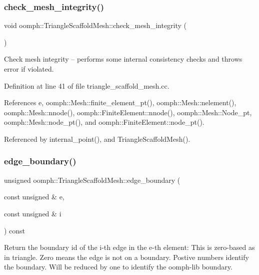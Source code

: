 \subsubsection{\texorpdfstring{check\+\_\+mesh\+\_\+integrity()}{check\_mesh\_integrity()}}
{\footnotesize\ttfamily void oomph\+::\+Triangle\+Scaffold\+Mesh\+::check\+\_\+mesh\+\_\+integrity (\begin{DoxyParamCaption}{ }\end{DoxyParamCaption})\hspace{0.3cm}{\ttfamily [protected]}}

Check mesh integrity -- performs some internal consistency checks and throws error if violated. 

Definition at line 41 of file triangle\+\_\+scaffold\+\_\+mesh.\+cc.



References e, oomph\+::\+Mesh\+::finite\+\_\+element\+\_\+pt(), oomph\+::\+Mesh\+::nelement(), oomph\+::\+Mesh\+::nnode(), oomph\+::\+Finite\+Element\+::nnode(), oomph\+::\+Mesh\+::\+Node\+\_\+pt, oomph\+::\+Mesh\+::node\+\_\+pt(), and oomph\+::\+Finite\+Element\+::node\+\_\+pt().



Referenced by internal\+\_\+point(), and Triangle\+Scaffold\+Mesh().

\mbox{\label{classoomph_1_1TriangleScaffoldMesh_abf7347ae13ede0f3b7b7510e86a82bf5}} 
\subsubsection{\texorpdfstring{edge\+\_\+boundary()}{edge\_boundary()}}
{\footnotesize\ttfamily unsigned oomph\+::\+Triangle\+Scaffold\+Mesh\+::edge\+\_\+boundary (\begin{DoxyParamCaption}\item[{const unsigned \&}]{e,  }\item[{const unsigned \&}]{i }\end{DoxyParamCaption}) const\hspace{0.3cm}{\ttfamily [inline]}}



Return the boundary id of the i-\/th edge in the e-\/th element\+: This is zero-\/based as in triangle. Zero means the edge is not on a boundary. Postive numbers identify the boundary. Will be reduced by one to identify the oomph-\/lib boundary. 



